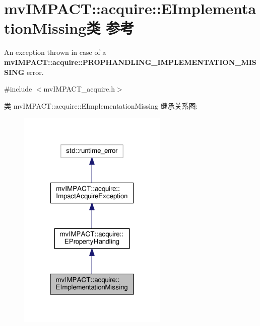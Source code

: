 \hypertarget{classmv_i_m_p_a_c_t_1_1acquire_1_1_e_implementation_missing}{\section{mv\+I\+M\+P\+A\+C\+T\+:\+:acquire\+:\+:E\+Implementation\+Missing类 参考}
\label{classmv_i_m_p_a_c_t_1_1acquire_1_1_e_implementation_missing}
}


An exception thrown in case of a {\bfseries mv\+I\+M\+P\+A\+C\+T\+::acquire\+::\+P\+R\+O\+P\+H\+A\+N\+D\+L\+I\+N\+G\+\_\+\+I\+M\+P\+L\+E\+M\+E\+N\+T\+A\+T\+I\+O\+N\+\_\+\+M\+I\+S\+S\+I\+N\+G} error.  




{\ttfamily \#include $<$mv\+I\+M\+P\+A\+C\+T\+\_\+acquire.\+h$>$}



类 mv\+I\+M\+P\+A\+C\+T\+:\+:acquire\+:\+:E\+Implementation\+Missing 继承关系图\+:
\nopagebreak
\begin{figure}[H]
\begin{center}
\leavevmode
\includegraphics[width=202pt]{classmv_i_m_p_a_c_t_1_1acquire_1_1_e_implementation_missing__inherit__graph}
\end{center}
\end{figure}


